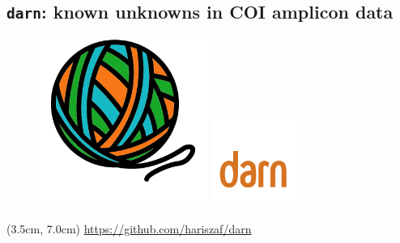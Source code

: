 \documentclass{beamer}
\begin{document}






   \begin{darkframes}
      \subsection{\texttt{darn}: known unknowns in COI amplicon data}
      \begin{frame}
         \begin{figure}
            \includegraphics[width=55mm]{resources/darn_logo.png}
            \includegraphics[width=30mm]{../met_nets/resources/darn-logo-text.png}
         \end{figure}


         \begin{textblock*}{7cm}(3.5cm, 7.0cm)
            \href{https://github.com/hariszaf/darn}{https://github.com/hariszaf/darn}
         \end{textblock*}


      \end{frame}
   \end{darkframes}
\end{document}
